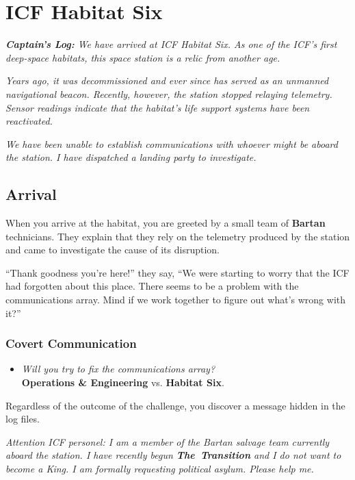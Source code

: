 \documentclass[11pt, a5paper, parskip=half-, DIV=12]{scrartcl}
\begin{document}
\section*{ICF Habitat Six}
\textit{\textbf{Captain's Log:} We have arrived at ICF Habitat Six. As one of the ICF's first deep-space habitats, this space station is a relic from another age.}

\textit{Years ago, it was decommissioned and ever since has served as an unmanned navigational beacon. Recently, however, the station stopped relaying telemetry. Sensor readings indicate that the habitat's life support systems have been reactivated.}

\textit{We have been unable to establish communications with whoever might be aboard the station. I have dispatched a landing party to investigate.}

\subsection*{Arrival}
When you arrive at the habitat, you are greeted by a small team of \textbf{Bartan} technicians. They explain that they rely on the telemetry produced by the station and came to investigate the cause of its disruption.

``Thank goodness you're here!'' they say, ``We were starting to worry that the ICF had forgotten about this place. There seems to be a problem with the communications array. Mind if we work together to figure out what's wrong with it?''

\subsubsection*{Covert Communication}
\begin{itemize}[topsep=0ex, partopsep=0ex]
	\item \textit{Will you try to fix the communications array?}\\ \textbf{Operations \& Engineering} vs. \textbf{Habitat Six}.
\end{itemize}
Regardless of the outcome of the challenge, you discover a message hidden in the log files.%

\textit{Attention ICF personel: I am a member of the Bartan salvage team currently aboard the station. I have recently begun \textbf{The~Transition} and I do not want to become a King. I am formally requesting political asylum. Please help me.}
\end{document}
